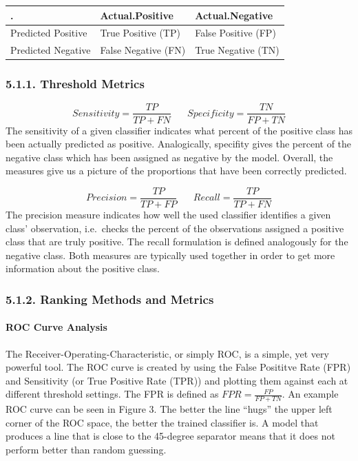 \documentclass[12pt,]{article}
\let\oldparagraph\paragraph
\renewcommand{\paragraph}[1]{\oldparagraph{#1}\mbox{}}
\begin{document}
\begin{longtable}[]{@{}lll@{}}
\toprule
. & Actual.Positive & Actual.Negative\tabularnewline
\midrule
\endhead
Predicted Positive & True Positive (TP) & False Positive
(FP)\tabularnewline
Predicted Negative & False Negative (FN) & True Negative
(TN)\tabularnewline
\bottomrule
\end{longtable}

\hypertarget{threshold-metrics}{%
\subsubsection{5.1.1. Threshold Metrics}\label{threshold-metrics}}

\[Sensitivity = \frac{TP}{TP + FN}\;\;\;\;\;\;Specificity =\frac{TN}{FP+TN} \]
The sensitivity of a given classifier indicates what percent of the
positive class has been actually predicted as positive. Analogically,
specifity gives the percent of the negative class which has been
assigned as negative by the model. Overall, the measures give us a
picture of the proportions that have been correctly predicted.

\[Precision = \frac{TP}{TP+FP}\;\;\;\;\;\;Recall=\frac{TP}{TP+FN}\] The
precision measure indicates how well the used classifier identifies a
given class' observation, i.e.~checks the percent of the observations
assigned a positive class that are truly positive. The recall
formulation is defined analogously for the negative class. Both measures
are typically used together in order to get more information about the
positive class.

\hypertarget{ranking-methods-and-metrics}{%
\subsubsection{5.1.2. Ranking Methods and
Metrics}\label{ranking-methods-and-metrics}}

\hypertarget{roc-curve-analysis}{%
\paragraph{ROC Curve Analysis}\label{roc-curve-analysis}}

The Receiver-Operating-Characteristic, or simply ROC, is a simple, yet
very powerful tool. The ROC curve is created by using the False
Posititve Rate (FPR) and Sensitivity (or True Positive Rate (TPR)) and
plotting them against each at different threshold settings. The FPR is
defined as \(FPR=\frac{FP}{FP+TN}\). An example ROC curve can be seen in
Figure 3. The better the line ``hugs'' the upper left corner of the ROC
space, the better the trained classifier is. A model that produces a
line that is close to the 45-degree separator means that it does not
perform better than random guessing.
\end{document}
